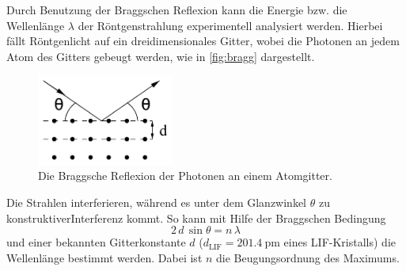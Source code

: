 Durch Benutzung der Braggschen Reflexion kann die Energie bzw. die Wellenlänge $\lambda$ der Röntgenstrahlung experimentell analysiert werden. 
Hierbei fällt Röntgenlicht auf ein dreidimensionales Gitter, wobei die Photonen an jedem Atom des Gitters gebeugt werden, wie in \autoref{fig:bragg} dargestellt.
\begin{figure}[H]
    \centering
    \includegraphics[width=0.4\textwidth]{pictures/bragg.pdf}
    \caption{Die Braggsche Reflexion der Photonen an einem Atomgitter. \cite{v602}}
    \label{fig:bragg}
\end{figure}
Die Strahlen interferieren, während es unter dem Glanzwinkel $\theta$ zu konstruktiverInterferenz kommt. 
So kann mit Hilfe der Braggschen Bedingung
\begin{equation} \label{eq:Winkel}
    2 \, d \, \sin \theta = n \, \lambda
\end{equation}
und einer bekannten Gitterkonstante $d$ ($d_\text{LIF} = \qty{201.4}{\pico\meter}$ eines LIF-Kristalls) die Wellenlänge bestimmt werden.
Dabei ist $n$ die Beugungsordnung des Maximums.
